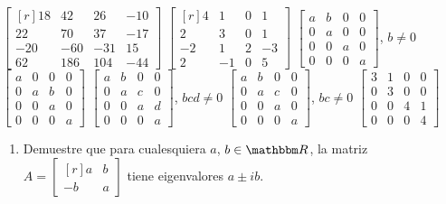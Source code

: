 \begin{tasks}[
    style=enumerate,
    label-offset = 3mm,
    ]
    \task $\begin{bmatrix*}[r]18 & 42 & 26 & -10 \\ 22 & 70 & 37 & -17 \\ -20 & -60 & -31 & 15 \\ 62 & 186 & 104 & -44\end{bmatrix*}$
    \task $\begin{bmatrix*}[r]4 & 1 & 0 & 1 \\ 2 & 3 & 0 & 1 \\ -2 & 1 & 2 & -3 \\ 2 & -1 & 0 & 5\end{bmatrix*}$
    \task $\begin{bmatrix*}a & b & 0 & 0 \\ 0 & a & 0 & 0 \\ 0 & 0 & a & 0 \\ 0 & 0 & 0 & a\end{bmatrix*}$, $b \neq 0$
    \task $\begin{bmatrix*}a & 0 & 0 & 0 \\ 0 & a & b & 0 \\ 0 & 0 & a & 0 \\ 0 & 0 & 0 & a\end{bmatrix*}$
    \task $\begin{bmatrix*}a & b & 0 & 0 \\ 0 & a & c & 0 \\ 0 & 0 & a & d \\ 0 & 0 & 0 & a\end{bmatrix*}$, $b c d \neq 0$
    \task $\begin{bmatrix*}a & b & 0 & 0 \\ 0 & a & c & 0 \\ 0 & 0 & a & 0 \\ 0 & 0 & 0 & a\end{bmatrix*}$, $b c \neq 0$
    \task $\begin{bmatrix*}3 & 1 & 0 & 0 \\ 0 & 3 & 0 & 0 \\ 0 & 0 & 4 & 1 \\ 0 & 0 & 0 & 4\end{bmatrix*}$
\end{tasks}
\begin{enumerate}[start=27]
    \item Demuestre que para cualesquiera $a$, $b \in \RR$, la matriz $A=\begin{bmatrix*}[r]a & b \\ -b & a\end{bmatrix*}$ tiene eigenvalores $a \pm i b$.
\end{enumerate}
